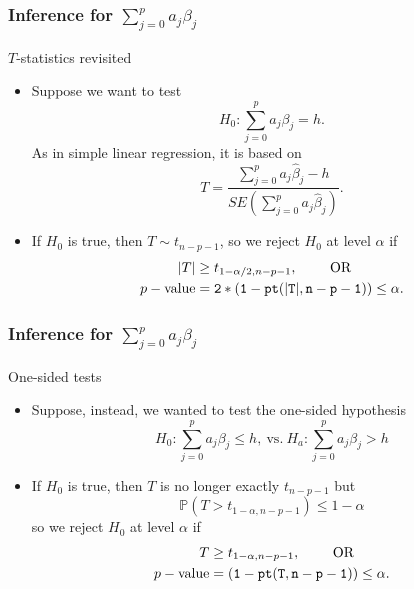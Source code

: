 \documentclass[handout]{beamer}
\newcommand{\Pp}{\mathbb{P}}
\begin{document}
   \begin{frame} \frametitle{Inference for $\sum_{j=0}^p a_j \beta_j$}

   \begin{block}
   {$T$-statistics revisited}
   \begin{itemize}
   \item Suppose we want to test
   $$H_0:\sum_{j=0}^p a_j\beta_j= h.$$ As in simple linear regression, it is based on
   $$
   T = \frac{\sum_{j=0}^p a_j \widehat{\beta}_j - h}{SE(\sum_{j=0}^p a_j \widehat{\beta}_j)}.$$
   \item If $H_0$ is true, then $T \sim t_{n-p-1}$, so we reject
   $H_0$ at level $\alpha$ if
   $$
   \begin{aligned}
   |T| &\geq t_{1-\alpha/2,n-p-1}, \qquad \text{ OR} \\
   p-\text{value} &= {\tt 2*(1-pt(|T|, n-p-1))} \leq \alpha.
   \end{aligned}
   $$
   \end{itemize}
   \end{block}
   \end{frame}


   \begin{frame} \frametitle{Inference for $\sum_{j=0}^p a_j \beta_j$}

   \begin{block}
   {One-sided tests}
   \begin{itemize}
   \item Suppose, instead, we wanted to test the one-sided hypothesis
   $$H_0:\sum_{j=0}^p a_j\beta_j \leq  h, \  \text{vs.} \ H_a: \sum_{j=0}^p a_j\beta_j >  h$$
   \item If $H_0$ is true, then $T$ is no longer exactly $t_{n-p-1}$
   but
   $$
   \Pp \left(T > t_{1-\alpha, n-p-1}\right) \leq 1 - \alpha$$
   so we reject $H_0$ at level $\alpha$ if
   $$
   \begin{aligned}
   T &\geq t_{1-\alpha,n-p-1}, \qquad \text{ OR} \\
   p-\text{value} &= {\tt (1-pt(T, n-p-1))} \leq \alpha.
   \end{aligned}
   $$
   \end{itemize}
   \end{block}
   \end{frame}

\end{document}
